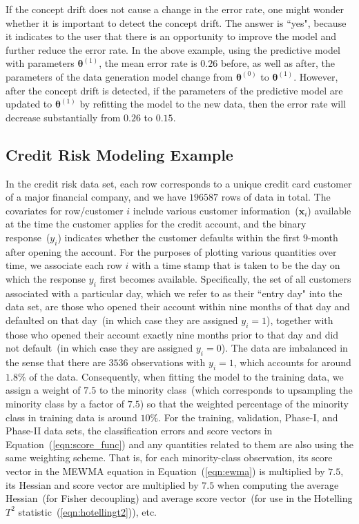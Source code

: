 \documentclass[twoside,11pt]{article}
\begin{document}
If the concept drift does not cause a change in the error rate, one might wonder whether it is important to detect the concept drift. The answer is ``yes", because it indicates to the user that there is an opportunity to improve the model and further reduce the error rate. In the above example, using the predictive model with parameters $\bm{\theta}^{(1)}$, the mean error rate is $0.26$ before, as well as after, the parameters of the data generation model change from $\bm{\theta}^{(0)}$ to $\bm{\theta}^{(1)}$. However, after the concept drift is detected, if the parameters of the predictive model are updated to $\bm{\theta}^{(1)}$ by refitting the model to the new data, then the error rate will decrease substantially from $0.26$ to $0.15$.


\subsection{Credit Risk Modeling Example}
\label{ss:cr_ds}
In the credit risk data set, each row corresponds to a unique credit card customer of a major financial company, and we have $196587$ rows of data in total. The covariates for row/customer $i$ include various customer information~($\bm {x}_i$) available at the time the customer applies for the credit account, and the binary response~($y_i$) indicates whether the customer defaults within the first $9$-month after opening the account. For the purposes of plotting various quantities over time, we associate each row $i$ with a time stamp that is taken to be the day on which the response $y_i$ first becomes available. Specifically, the set of all customers associated with a particular day, which we refer to as their ``entry day" into the data set, are those who opened their account within nine months of that day and defaulted on that day~(in which case they are assigned $y_i=1$), together with those who opened their account exactly nine months prior to that day and did not default~(in which case they are assigned $y_i=0$). The data are imbalanced in the sense that there are $3536$ observations with $y_i = 1$, which accounts for around $1.8\%$ of the data. Consequently, when fitting the model to the training data, we assign a weight of $7.5$ to the minority class~(which corresponds to upsampling the minority class by a factor of $7.5$) so that the weighted percentage of the minority class in training data is around $10\%$. For the training, validation, Phase-I, and Phase-II data sets, the classification errors and score vectors in Equation~(\ref{eqn:score_func}) and any quantities related to them are also using the same weighting scheme. That is, for each minority-class observation, its score vector in the MEWMA equation in Equation~(\ref{eqn:ewma}) is multiplied by $7.5$, its Hessian and score vector are multiplied by $7.5$ when computing the average Hessian~(for Fisher decoupling) and average score vector~(for use in the Hotelling $T^2$ statistic~(\ref{eqn:hotellingt2})), etc. 
\end{document}
